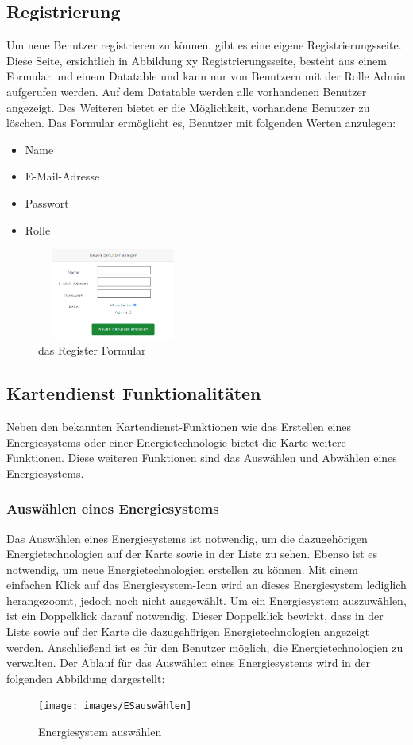 \subsection{Registrierung}
Um neue Benutzer registrieren zu können, gibt es eine eigene Registrierungsseite. Diese Seite, ersichtlich in Abbildung xy Registrierungsseite, besteht aus einem Formular und einem Datatable und kann nur von Benutzern mit der Rolle Admin aufgerufen werden. Auf dem Datatable werden alle vorhandenen Benutzer angezeigt. Des Weiteren bietet er die Möglichkeit, vorhandene Benutzer zu löschen. Das Formular ermöglicht es, Benutzer mit folgenden Werten anzulegen:
\begin{itemize}
	\item Name  
	\item E-Mail-Adresse
	\item Passwort  
	\item Rolle 
\end{itemize}
\begin{figure}[h]
	\centering
	\includegraphics[height=3cm,width=5cm]{images/RegisterFormular}
	\caption{das Register Formular}
	\label{fig:Register Formular}
\end{figure}
\newpage


\subsection{Kartendienst Funktionalitäten}
Neben den bekannten Kartendienst-Funktionen wie das Erstellen eines Energiesystems oder einer Energietechnologie bietet die Karte weitere Funktionen. Diese weiteren Funktionen sind das Auswählen und Abwählen eines Energiesystems.

\subsubsection{Auswählen eines Energiesystems}
Das Auswählen eines Energiesystems ist notwendig, um die dazugehörigen Energietechnologien auf der Karte sowie in der Liste zu sehen. Ebenso ist es notwendig, um neue Energietechnologien erstellen zu können.
Mit einem einfachen Klick auf das Energiesystem-Icon wird an dieses Energiesystem lediglich herangezoomt, jedoch noch nicht ausgewählt.
Um ein Energiesystem auszuwählen, ist ein Doppelklick darauf notwendig. Dieser Doppelklick bewirkt, dass in der Liste sowie auf der Karte die dazugehörigen Energietechnologien angezeigt werden. Anschließend ist es für den Benutzer möglich, die Energietechnologien zu verwalten. Der Ablauf für das Auswählen eines Energiesystems wird in der folgenden Abbildung dargestellt:
\newline
\begin{figure}[h]
	\centering
	\texttt{[image: images/ESauswählen]}
	\caption{Energiesystem auswählen}
	\label{fig:Energiesystem auswählen }
\end{figure}


